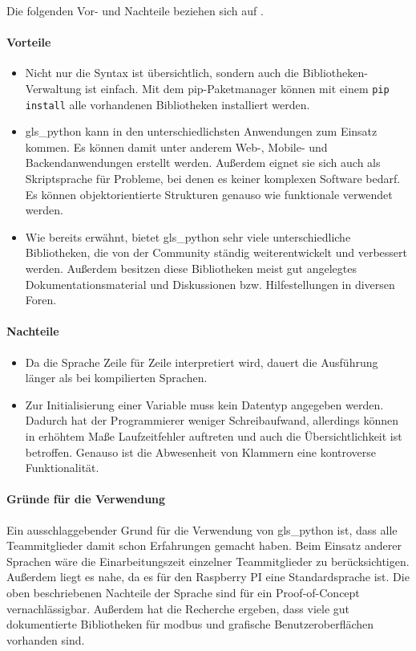 Die folgenden Vor- und Nachteile beziehen sich auf \textcite[vgl.][]{Ceaseo:2020}.
\paragraph{Vorteile}
\begin{itemize}
	\item Nicht nur die Syntax ist übersichtlich, sondern auch die Bibliotheken-Verwaltung ist einfach. Mit dem pip-Paketmanager können mit einem \texttt{pip install} alle vorhandenen Bibliotheken installiert werden.
	\item \gls{gls_python} kann in den unterschiedlichsten Anwendungen zum Einsatz kommen. Es können damit unter anderem Web-, Mobile- und Backendanwendungen erstellt werden. Außerdem eignet sie sich auch als Skriptsprache für Probleme, bei denen es keiner komplexen Software bedarf. Es können objektorientierte Strukturen genauso wie funktionale verwendet werden. 
	\item Wie bereits erwähnt, bietet \gls{gls_python} sehr viele unterschiedliche Bibliotheken, die von der Community ständig weiterentwickelt und verbessert werden. Außerdem besitzen diese Bibliotheken meist gut angelegtes Dokumentationsmaterial und Diskussionen bzw. Hilfestellungen in diversen Foren.
\end{itemize}

\paragraph{Nachteile}
\begin{itemize}{}{}
	\item Da die Sprache Zeile für Zeile interpretiert wird, dauert die Ausführung länger als bei kompilierten Sprachen.
	\item Zur Initialisierung einer Variable muss kein Datentyp angegeben werden. Dadurch hat der Programmierer weniger Schreibaufwand, allerdings können in erhöhtem Maße Laufzeitfehler auftreten und auch die Übersichtlichkeit ist betroffen. Genauso ist die Abwesenheit von Klammern eine kontroverse Funktionalität.
\end{itemize}

\paragraph{Gründe für die Verwendung}
Ein ausschlaggebender Grund für die Verwendung von \gls{gls_python} ist, dass alle Teammitglieder damit schon Erfahrungen gemacht haben. Beim Einsatz anderer Sprachen wäre die Einarbeitungszeit einzelner Teammitglieder zu berücksichtigen. Außerdem liegt es nahe, da es für den Raspberry PI eine Standardsprache ist. Die oben beschriebenen Nachteile der Sprache sind für ein Proof-of-Concept vernachlässigbar. Außerdem hat die Recherche ergeben, dass viele gut dokumentierte Bibliotheken für \gls{modbus} und grafische Benutzeroberflächen vorhanden sind.

